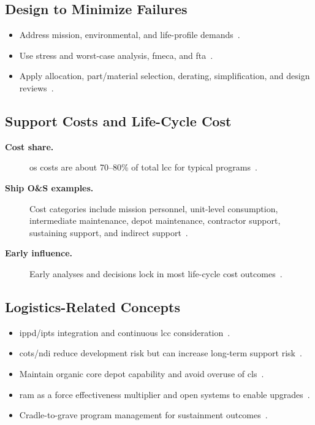 \documentclass[../main.tex]{subfiles}
\begin{document}
\subsection{Design to Minimize Failures}
\begin{itemize}
  \item Address mission, environmental, and life-profile demands~\autocite{edo-3-5-4-acquisition-logistics-2025}.
  \item Use stress and worst-case analysis, \ac{fmeca}, and \ac{fta}~\autocite{edo-3-5-4-acquisition-logistics-2025}.
  \item Apply allocation, part/material selection, derating, simplification, and design reviews~\autocite{edo-3-5-4-acquisition-logistics-2025}.
\end{itemize}

\subsection{Support Costs and Life-Cycle Cost}
\begin{description}
  \item[\textbf{Cost share.}] \ac{os} costs are about 70--80\% of total \ac{lcc} for typical programs~\autocite{edo-3-5-4-acquisition-logistics-2025}.
  \item[\textbf{Ship O\&S examples.}] Cost categories include mission personnel, unit-level consumption, intermediate maintenance, depot maintenance, contractor support, sustaining support, and indirect support~\autocite{edo-3-5-4-acquisition-logistics-2025}.
  \item[\textbf{Early influence.}] Early analyses and decisions lock in most life-cycle cost outcomes~\autocite{edo-3-5-4-acquisition-logistics-2025}.
\end{description}

\subsection{Logistics-Related Concepts}
\begin{itemize}
  \item \ac{ippd}/\acp{ipt} integration and continuous \ac{lcc} consideration~\autocite{edo-3-5-4-acquisition-logistics-2025}.
  \item \ac{cots}/\ac{ndi} reduce development risk but can increase long-term support risk~\autocite{edo-3-5-4-acquisition-logistics-2025}.
  \item Maintain organic core depot capability and avoid overuse of \ac{cls}~\autocite{edo-3-5-4-acquisition-logistics-2025}.
  \item \ac{ram} as a force effectiveness multiplier and open systems to enable upgrades~\autocite{edo-3-5-4-acquisition-logistics-2025}.
  \item Cradle-to-grave program management for sustainment outcomes~\autocite{edo-3-5-4-acquisition-logistics-2025}.
\end{itemize}
\end{document}
